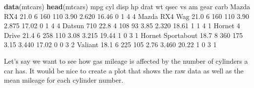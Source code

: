 \documentclass[]{book}
\newenvironment{Shaded}{\begin{snugshade}}{\end{snugshade}}
\newcommand{\DecValTok}[1]{\textcolor[rgb]{0.00,0.00,0.81}{#1}}
\newcommand{\FloatTok}[1]{\textcolor[rgb]{0.00,0.00,0.81}{#1}}
\newcommand{\KeywordTok}[1]{\textcolor[rgb]{0.13,0.29,0.53}{\textbf{#1}}}
\newcommand{\NormalTok}[1]{#1}
\begin{document}
\begin{Shaded}
\begin{Highlighting}[]
\KeywordTok{data}\NormalTok{(mtcars)}
\KeywordTok{head}\NormalTok{(mtcars)}
\NormalTok{                   mpg cyl disp  hp drat    wt  qsec vs am gear carb}
\NormalTok{Mazda RX4         }\FloatTok{21.0}   \DecValTok{6}  \DecValTok{160} \DecValTok{110} \FloatTok{3.90} \FloatTok{2.620} \FloatTok{16.46}  \DecValTok{0}  \DecValTok{1}    \DecValTok{4}    \DecValTok{4}
\NormalTok{Mazda RX4 Wag     }\FloatTok{21.0}   \DecValTok{6}  \DecValTok{160} \DecValTok{110} \FloatTok{3.90} \FloatTok{2.875} \FloatTok{17.02}  \DecValTok{0}  \DecValTok{1}    \DecValTok{4}    \DecValTok{4}
\NormalTok{Datsun }\DecValTok{710}        \FloatTok{22.8}   \DecValTok{4}  \DecValTok{108}  \DecValTok{93} \FloatTok{3.85} \FloatTok{2.320} \FloatTok{18.61}  \DecValTok{1}  \DecValTok{1}    \DecValTok{4}    \DecValTok{1}
\NormalTok{Hornet }\DecValTok{4}\NormalTok{ Drive    }\FloatTok{21.4}   \DecValTok{6}  \DecValTok{258} \DecValTok{110} \FloatTok{3.08} \FloatTok{3.215} \FloatTok{19.44}  \DecValTok{1}  \DecValTok{0}    \DecValTok{3}    \DecValTok{1}
\NormalTok{Hornet Sportabout }\FloatTok{18.7}   \DecValTok{8}  \DecValTok{360} \DecValTok{175} \FloatTok{3.15} \FloatTok{3.440} \FloatTok{17.02}  \DecValTok{0}  \DecValTok{0}    \DecValTok{3}    \DecValTok{2}
\NormalTok{Valiant           }\FloatTok{18.1}   \DecValTok{6}  \DecValTok{225} \DecValTok{105} \FloatTok{2.76} \FloatTok{3.460} \FloatTok{20.22}  \DecValTok{1}  \DecValTok{0}    \DecValTok{3}    \DecValTok{1}
\end{Highlighting}
\end{Shaded}

Let's say we want to see how gas mileage is affected by the number of cylinders a car has. It would be nice to create a plot that shows the raw data as well as the mean mileage for each cylinder number.
\end{document}
